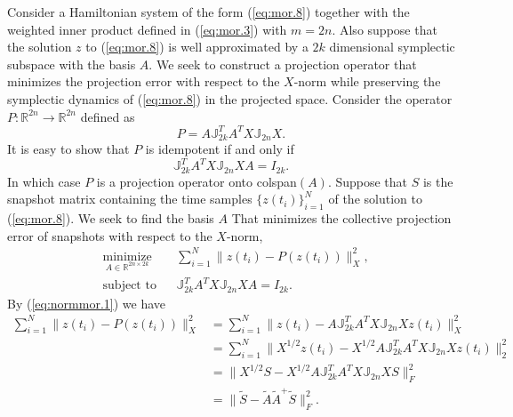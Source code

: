 Consider a Hamiltonian system of the form (\ref{eq:mor.8}) together with the weighted inner product defined in (\ref{eq:mor.3}) with $m=2n$. Also suppose that the solution $z$ to (\ref{eq:mor.8}) is well approximated by a $2k$ dimensional symplectic subspace with the basis $A$. We seek to construct a projection operator that minimizes the projection error with respect to the $X$-norm while preserving the symplectic dynamics of (\ref{eq:mor.8}) in the projected space. Consider the operator $P: \mathbb R^{2n} \to \mathbb R^{2n}$ defined as
\begin{equation} \label{eq:normmor.1}
	P = A \mathbb J_{2k}^T A^T X \mathbb J_{2n} X.
\end{equation}
It is easy to show that $P$ is idempotent if and only if
\begin{equation} \label{eq:normmor.2}
	\mathbb J_{2k}^T A^T X \mathbb J_{2n} X A = I_{2k}.
\end{equation}
In which case $P$ is a projection operator onto colspan$(A)$. Suppose that $S$ is the snapshot matrix containing the time samples $\{z(t_i)\}_{i=1}^N$ of the solution to (\ref{eq:mor.8}). We seek to find the basis $A$ That minimizes the collective projection error of snapshots with respect to the $X$-norm,
\begin{equation} \label{eq:normmor.3}
\begin{aligned}
& \underset{A\in \mathbb{R}^{2n\times 2k}}{\text{minimize}}
& & \sum_{i=1}^N \| z(t_i) - P(z(t_i)) \|_X^2, \\
& \text{subject to}
& & \mathbb J_{2k}^T A^T X \mathbb J_{2n} X A = I_{2k}.
\end{aligned}
\end{equation}
By (\ref{eq:normmor.1}) we have
\begin{equation} \label{eq:normmor.4}
\begin{aligned}
	\sum_{i=1}^N \| z(t_i) - P(z(t_i)) \|_X^2 &= \sum_{i=1}^N \| z(t_i) - A \mathbb J_{2k}^T A^T X \mathbb J_{2n} X z(t_i) \|_X^2 \\
	&= \sum_{i=1}^N \| X^{1/2}z(t_i) - X^{1/2} A \mathbb J_{2k}^T A^T X \mathbb J_{2n} X z(t_i) \|_2^2 \\
	&= \| X^{1/2} S - X^{1/2} A \mathbb J_{2k}^T A^T X \mathbb J_{2n} X S \|_F^2 \\
	&= \| \tilde S - \tilde A \tilde A ^+ \tilde S \|_F^2.
\end{aligned}
\end{equation}
